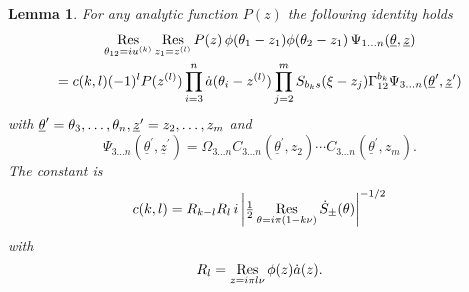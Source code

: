 \documentclass[a4paper,a4paper]{article}
\newtheorem{lemma}[theorem]{Lemma}
\begin{document}
\begin{lemma}
For any analytic function $P(z)$ the following identity holds 
\begin{multline*}
\mathop{\rm Res}_{\theta _{12}=iu^{(k)}}\mathop{\rm Res}_{z_{1}=z^{(l)}}P(z)%
\,\phi (\theta _{1}-z_{1})\phi (\theta _{2}-z_{1})\,\Psi _{1\dots n}(%
\underline{\theta },{\underline{z}}) \\
=c(k,l)(-1)^{l}P(z^{(l)})\prod_{i=3}^{n}\dot{a}(\theta
_{i}-z^{(l)})\prod_{j=2}^{m}S_{b_{k}s}(\xi -z_{j})\Gamma _{12}^{b_{k}}\Psi
_{3\dots n}(\underline{\theta }^{\prime },{\underline{z}}^{\prime })
\end{multline*}
with $\underline{\theta }^{\prime }=\theta _{3},\dots ,\theta _{n},{%
\underline{z}}^{\prime }=z_{2},\dots ,z_{m}$ and 
\[
\Psi _{3\dots n}(\underline{\theta }^{\prime },{\underline{z}}^{\prime
})=\Omega _{3\dots n}C_{3\dots n}({\underline{\theta }}^{\prime
},z_{2})\cdots C_{3\dots n}({\underline{\theta }}^{\prime },z_{m}). 
\]
The constant is 
\[
c(k,l)=R_{k-l}R_{l}\,i\left| \tfrac{1}{2}\mathop{\rm Res}_{\theta =i\pi
(1-k\nu )}\dot{S}_{\pm }(\theta )\right| ^{-1/2} 
\]
with 
\[
R_{l}=\mathop{\rm Res}_{z=i\pi l\nu }\phi (z)\dot{a}(z). 
\]
\end{lemma}
\end{document}
